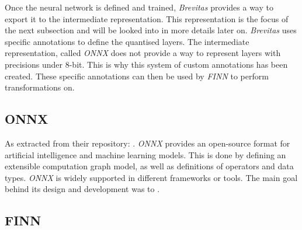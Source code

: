 Once the neural network is defined and trained, \emph{Brevitas} provides a way to export it to the intermediate representation. This representation is the focus of the next subsection and will be looked into in more details later on. \emph{Brevitas} uses specific annotations to define the quantised layers.  The intermediate representation, called \emph{ONNX} does not provide a way to represent layers with precisions under 8-bit. This is why this system of custom annotations has been created. These specific annotations can then be used by \emph{FINN} to perform transformations on.


\subsection{ONNX}

As extracted from their repository: . \emph{ONNX} provides an open-source format for artificial intelligence and machine learning models. This is done by defining an extensible computation graph model, as well as definitions of operators and data types. \emph{ONNX} is widely supported in different frameworks or tools. The main goal behind its design and development was to .





\subsection{FINN}

